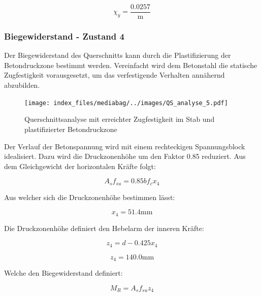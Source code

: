 \documentclass[
  12pt,
  letterpaper,
  egregdoesnotlikesansseriftitles]{scrreprt}
\begin{document}
\begin{equation}\chi_{y} = \frac{0.0257}{\text{m}}\end{equation}

\hypertarget{biegewiderstand---zustand-4}{%
\subsubsection{Biegewiderstand - Zustand
4}\label{biegewiderstand---zustand-4}}

Der Biegewiderstand des Querschnitts kann durch die Plastifizierung der
Betondruckzone bestimmt werden. Vereinfacht wird dem Betonstahl die
statische Zugfestigkeit vorausgesetzt, um das verfestigende Verhalten
annähernd abzubilden.

\begin{figure}[H]

{\centering \texttt{[image: index\_files/mediabag/../images/QS\_analyse\_5.pdf]}

}

\caption{\label{fig-qs5}Querschnittsanalyse mit erreichter Zugfestigkeit
im Stab und plastifizierter Betondruckzone}

\end{figure}

Der Verlauf der Betonspannung wird mit einem rechteckigen Spannungsblock
idealisiert. Dazu wird die Druckzonenhöhe um den Faktor 0.85 reduziert.
Aus dem Gleichgewicht der horizontalen Kräfte folgt:

\begin{equation}A_{s} f_{su} = 0.85 b f_{c} x_{4}\end{equation}

Aus welcher sich die Druckzonenhöhe bestimmen lässt:

\begin{equation}x_{4} = 51.4 \text{mm}\end{equation}

Die Druckzonenhöhe definiert den Hebelarm der inneren Kräfte:

\begin{equation}z_{4} = d - 0.425 x_{4}\end{equation}

\begin{equation}z_{4} = 140.0 \text{mm}\end{equation}

Welche den Biegewiderstand definiert:

\begin{equation}M_{R} = A_{s} f_{su} z_{4}\end{equation}
\end{document}
